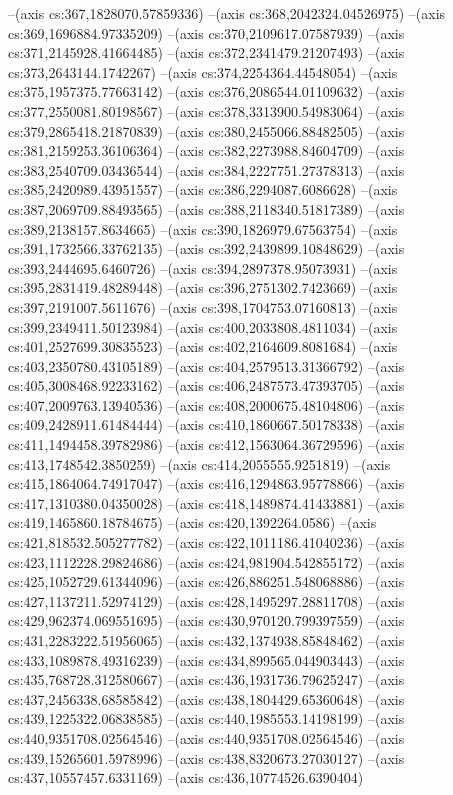 --(axis cs:367,1828070.57859336)
--(axis cs:368,2042324.04526975)
--(axis cs:369,1696884.97335209)
--(axis cs:370,2109617.07587939)
--(axis cs:371,2145928.41664485)
--(axis cs:372,2341479.21207493)
--(axis cs:373,2643144.1742267)
--(axis cs:374,2254364.44548054)
--(axis cs:375,1957375.77663142)
--(axis cs:376,2086544.01109632)
--(axis cs:377,2550081.80198567)
--(axis cs:378,3313900.54983064)
--(axis cs:379,2865418.21870839)
--(axis cs:380,2455066.88482505)
--(axis cs:381,2159253.36106364)
--(axis cs:382,2273988.84604709)
--(axis cs:383,2540709.03436544)
--(axis cs:384,2227751.27378313)
--(axis cs:385,2420989.43951557)
--(axis cs:386,2294087.6086628)
--(axis cs:387,2069709.88493565)
--(axis cs:388,2118340.51817389)
--(axis cs:389,2138157.8634665)
--(axis cs:390,1826979.67563754)
--(axis cs:391,1732566.33762135)
--(axis cs:392,2439899.10848629)
--(axis cs:393,2444695.6460726)
--(axis cs:394,2897378.95073931)
--(axis cs:395,2831419.48289448)
--(axis cs:396,2751302.7423669)
--(axis cs:397,2191007.5611676)
--(axis cs:398,1704753.07160813)
--(axis cs:399,2349411.50123984)
--(axis cs:400,2033808.4811034)
--(axis cs:401,2527699.30835523)
--(axis cs:402,2164609.8081684)
--(axis cs:403,2350780.43105189)
--(axis cs:404,2579513.31366792)
--(axis cs:405,3008468.92233162)
--(axis cs:406,2487573.47393705)
--(axis cs:407,2009763.13940536)
--(axis cs:408,2000675.48104806)
--(axis cs:409,2428911.61484444)
--(axis cs:410,1860667.50178338)
--(axis cs:411,1494458.39782986)
--(axis cs:412,1563064.36729596)
--(axis cs:413,1748542.3850259)
--(axis cs:414,2055555.9251819)
--(axis cs:415,1864064.74917047)
--(axis cs:416,1294863.95778866)
--(axis cs:417,1310380.04350028)
--(axis cs:418,1489874.41433881)
--(axis cs:419,1465860.18784675)
--(axis cs:420,1392264.0586)
--(axis cs:421,818532.505277782)
--(axis cs:422,1011186.41040236)
--(axis cs:423,1112228.29824686)
--(axis cs:424,981904.542855172)
--(axis cs:425,1052729.61344096)
--(axis cs:426,886251.548068886)
--(axis cs:427,1137211.52974129)
--(axis cs:428,1495297.28811708)
--(axis cs:429,962374.069551695)
--(axis cs:430,970120.799397559)
--(axis cs:431,2283222.51956065)
--(axis cs:432,1374938.85848462)
--(axis cs:433,1089878.49316239)
--(axis cs:434,899565.044903443)
--(axis cs:435,768728.312580667)
--(axis cs:436,1931736.79625247)
--(axis cs:437,2456338.68585842)
--(axis cs:438,1804429.65360648)
--(axis cs:439,1225322.06838585)
--(axis cs:440,1985553.14198199)
--(axis cs:440,9351708.02564546)
--(axis cs:440,9351708.02564546)
--(axis cs:439,15265601.5978996)
--(axis cs:438,8320673.27030127)
--(axis cs:437,10557457.6331169)
--(axis cs:436,10774526.6390404)
